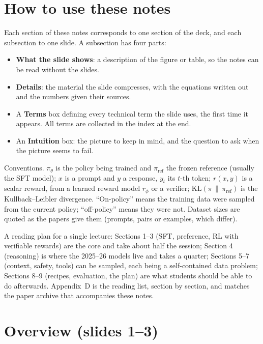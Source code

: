 \documentclass[11pt,letterpaper]{article}
\newcommand{\setstage}[1]{\colorlet{stagec}{#1}}
\newcommand{\piref}{\pi_{\mathrm{ref}}}
\newcommand{\pit}{\pi_\theta}\newcommand{\KL}{\mathrm{KL}}
\begin{document}
\section*{How to use these notes}
Each section of these notes corresponds to one section of the deck, and each subsection to one slide. A subsection has four parts:
\begin{itemize}
  \item \textbf{What the slide shows}: a description of the figure or table, so the notes can be read without the slides.
  \item \textbf{Details}: the material the slide compresses, with the equations written out and the numbers given their sources.
  \item A \textbf{Terms} box defining every technical term the slide uses, the first time it appears. All terms are collected in the index at the end.
  \item An \textbf{Intuition} box: the picture to keep in mind, and the question to ask when the picture seems to fail.
\end{itemize}
Conventions. $\pit$ is the policy being trained and $\piref$ the frozen reference (usually the SFT model); $x$ is a prompt and $y$ a response, $y_t$ its $t$-th token; $r(x,y)$ is a scalar reward, from a learned reward model $r_\phi$ or a verifier; $\KL(\pi\,\|\,\piref)$ is the Kullback--Leibler divergence. ``On-policy'' means the training data were sampled from the current policy; ``off-policy'' means they were not. Dataset sizes are quoted as the papers give them (prompts, pairs or examples, which differ).

A reading plan for a single lecture: Sections 1--3 (SFT, preference, RL with verifiable rewards) are the core and take about half the session; Section 4 (reasoning) is where the 2025--26 models live and takes a quarter; Sections 5--7 (context, safety, tools) can be sampled, each being a self-contained data problem; Sections 8--9 (recipes, evaluation, the plan) are what students should be able to do afterwards. Appendix~D is the reading list, section by section, and matches the paper archive that accompanies these notes.

\setstage{ink}
\section{Overview (slides 1--3)}
\end{document}
